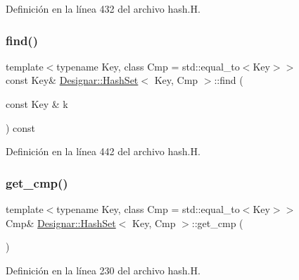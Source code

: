 Definición en la línea 432 del archivo hash.\+H.

\mbox{\label{class_designar_1_1_hash_set_a10f079f500c953b61d77263f3b6c68ca}} 
\subsubsection{\texorpdfstring{find()}{find()}\hspace{0.1cm}{\footnotesize\ttfamily [2/2]}}
{\footnotesize\ttfamily template$<$typename Key, class Cmp = std\+::equal\+\_\+to$<$\+Key$>$$>$ \\
const Key\& \hyperlink{class_designar_1_1_hash_set}{Designar\+::\+Hash\+Set}$<$ Key, Cmp $>$\+::find (\begin{DoxyParamCaption}\item[{const Key \&}]{k }\end{DoxyParamCaption}) const\hspace{0.3cm}{\ttfamily [inline]}}



Definición en la línea 442 del archivo hash.\+H.

\mbox{\label{class_designar_1_1_hash_set_ad799ffaf641176e823513b63be44cfe2}} 
\subsubsection{\texorpdfstring{get\+\_\+cmp()}{get\_cmp()}\hspace{0.1cm}{\footnotesize\ttfamily [1/2]}}
{\footnotesize\ttfamily template$<$typename Key, class Cmp = std\+::equal\+\_\+to$<$\+Key$>$$>$ \\
Cmp\& \hyperlink{class_designar_1_1_hash_set}{Designar\+::\+Hash\+Set}$<$ Key, Cmp $>$\+::get\+\_\+cmp (\begin{DoxyParamCaption}{ }\end{DoxyParamCaption})\hspace{0.3cm}{\ttfamily [inline]}}



Definición en la línea 230 del archivo hash.\+H.

